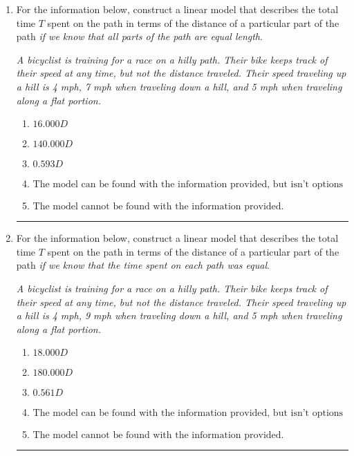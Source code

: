 \documentclass[14pt]{extbook}
\newcommand{\litem}[1]{\item#1\hspace*{-1cm}\rule{\textwidth}{0.4pt}}
\begin{document}
\begin{enumerate}
{\begin{enumerate}[label=\Alph*.]
\end{enumerate} }
\litem{
For the information below, construct a linear model that describes the total time $T$ spent on the path in terms of the distance of a particular part of the path \textit{if we know that all parts of the path are equal length}.
\begin{center}
    \textit{ A bicyclist is training for a race on a hilly path. Their bike keeps track of their speed at any time, but not the distance traveled. Their speed traveling up a hill is 4 mph, 7 mph when traveling down a hill, and 5 mph when traveling along a flat portion. }
\end{center}
\begin{enumerate}[label=\Alph*.]
\item \( 16.000 D \)
\item \( 140.000 D \)
\item \( 0.593 D \)
\item \( \text{The model can be found with the information provided, but isn't options 1-3.} \)
\item \( \text{The model cannot be found with the information provided.} \)

\end{enumerate} }
\litem{
For the information below, construct a linear model that describes the total time $T$ spent on the path in terms of the distance of a particular part of the path \textit{if we know that the time spent on each path was equal}.
\begin{center}
    \textit{ A bicyclist is training for a race on a hilly path. Their bike keeps track of their speed at any time, but not the distance traveled. Their speed traveling up a hill is 4 mph, 9 mph when traveling down a hill, and 5 mph when traveling along a flat portion. }
\end{center}
\begin{enumerate}[label=\Alph*.]
\item \( 18.000 D \)
\item \( 180.000 D \)
\item \( 0.561 D \)
\item \( \text{The model can be found with the information provided, but isn't options 1-3.} \)
\item \( \text{The model cannot be found with the information provided.} \)


\end{enumerate}}
\end{enumerate}
\end{document}
